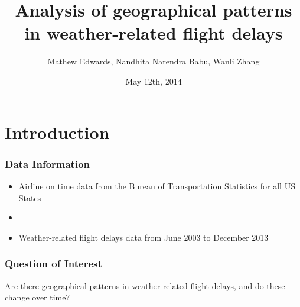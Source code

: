 \documentclass{beamer}
\title{Analysis of geographical patterns in weather-related flight delays}
\author{Mathew Edwards, Nandhita Narendra Babu, Wanli Zhang}
\date{May 12th, 2014}
\begin{document}
\begin{frame}
\titlepage
\end{frame}

\begin{frame}{\contentsname}
\tableofcontents
\end{frame}

\section{Introduction}

\begin{frame}
\frametitle{Data Information}
\begin{itemize}
\item Airline on time data from the Bureau of Transportation Statistics for all US States

\item[]

\item Weather-related flight delays data from June 2003 to December 2013
\end{itemize}
\end{frame}


\begin{frame}
\frametitle{Question of Interest}
Are there geographical patterns in weather-related flight delays, and do these change over time?
\end{frame}


\end{document}
